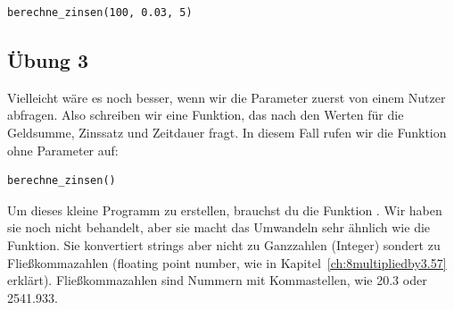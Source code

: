 \begin{Verbatim}[frame=single]
berechne_zinsen(100, 0.03, 5)
\end{Verbatim}

\subsection*{Übung 3}
Vielleicht wäre es noch besser, wenn wir die Parameter zuerst von einem Nutzer abfragen. Also schreiben wir eine Funktion, das nach den Werten für die Geldsumme, Zinssatz und Zeitdauer fragt. In diesem Fall rufen wir die Funktion ohne Parameter auf:

\begin{Verbatim}[frame=single]
berechne_zinsen()
\end{Verbatim}

\noindent
Um dieses kleine Programm zu erstellen, brauchst du die Funktion . Wir haben sie noch nicht behandelt, aber sie macht das Umwandeln sehr ähnlich wie die  Funktion. Sie konvertiert strings aber nicht zu Ganzzahlen (Integer) sondert zu Fließkommazahlen (floating point number, wie in Kapitel~\ref{ch:8multipliedby3.57} erklärt). Fließkommazahlen sind Nummern mit Kommastellen, wie 20.3 oder 2541.933.

\newpage
